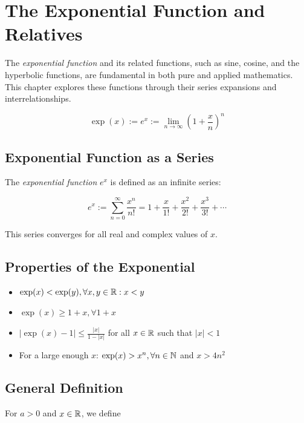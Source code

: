\chapter{The Exponential Function and Relatives}

The \emph{exponential function} and its related functions, such as sine, cosine, and the hyperbolic functions, 
are fundamental in both pure and applied mathematics. This chapter explores these functions through their 
series expansions and interrelationships.

\[
    \exp(x) := e^x :=\lim_{n \to \infty} \left(1 + \frac{x}{n}\right)^n
\]

\section{Exponential Function as a Series}

The \emph{exponential function} \(e^x\) is defined as an infinite series:

\[
    e^x := \sum_{n=0}^{\infty} \frac{x^n}{n!}
    = 1 + \frac{x}{1!} + \frac{x^2}{2!} + \frac{x^3}{3!} + \cdots
\]

This series converges for all real and complex values of \(x\).

\section{Properties of the Exponential}

\begin{itemize}

    \item \(\exp(x) < \exp(y), \forall x, y \in \mathbb{R} : x < y\)

    \item \(\exp(x) \ge 1 + x, \forall 1 + x\)

    \item \(|\exp(x) - 1| \le \frac{|x|}{1 - |x|}\) for all \(x \in \mathbb{R}\) such that \(|x| < 1\)

    \item For a large enough \(x\): \(\exp(x) > x^n, \forall n \in \mathbb{N}\) and \(x > 4n^2\)

\end{itemize}

\section{General Definition}

For \(a > 0\) and \(x \in \mathbb{R}\), we define

